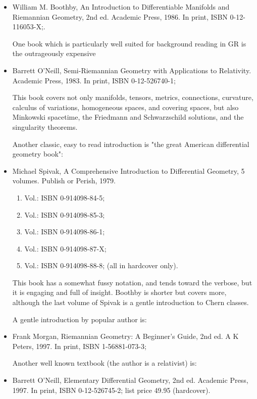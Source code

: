 \documentclass[10pt,a4paper]{book}
\theoremstyle{definition}
\begin{document}
\begin{itemize}
\item William M. Boothby,
An Introduction to Differentiable Manifolds and Riemannian Geometry, 2nd ed.
Academic Press, 1986.
In print, ISBN 0-12-116053-X;.

One book which is particularly well suited for background reading in GR is the outrageously expensive

\item Barrett O'Neill,
Semi-Riemannian Geometry with Applications to Relativity.
Academic Press, 1983.
In print, ISBN 0-12-526740-1; 

This book covers not only manifolds, tensors, metrics, connections, curvature, calculus of variations, homogeneous spaces, and covering spaces, but also Minkowski spacetime, the Friedmann and Schwarzschild solutions, and the singularity theorems.

Another classic, easy to read introduction is "the great American differential geometry book":

\item Michael Spivak,
A Comprehensive Introduction to Differential Geometry, 5 volumes. Publish or Perish, 1979.
\begin{enumerate}
\item Vol.: ISBN 0-914098-84-5; 
\item Vol.: ISBN 0-914098-85-3;
\item Vol.: ISBN 0-914098-86-1;
\item Vol.: ISBN 0-914098-87-X;
\item Vol.: ISBN 0-914098-88-8; (all in hardcover only).
\end{enumerate}

This book has a somewhat fussy notation, and tends toward the verbose, but it is engaging and full of insight.  Boothby is shorter but covers more, although the last volume of Spivak is a gentle introduction to Chern classes.

A gentle introduction by popular author is:

\item Frank Morgan,
Riemannian Geometry: A Beginner's Guide, 2nd ed.
A K Peters, 1997.
In print, ISBN 1-56881-073-3; 

Another well known textbook (the author is a relativist) is:

\item Barrett O'Neill,
Elementary Differential Geometry, 2nd ed.
Academic Press, 1997.
In print, ISBN 0-12-526745-2; list price 49.95 (hardcover).


\end{itemize}
\end{document}
